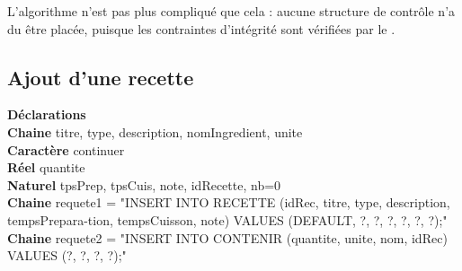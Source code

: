 \documentclass[a4paper,10pt]{report}
\begin{document}
L'algorithme n'est pas plus compliqué que cela : aucune structure de contrôle n'a du être placée, puisque les contraintes d'intégrité sont vérifiées par le .
%

\subsection{Ajout d'une recette}

\textbf{Déclarations}\\
	\indent\indent\textbf{Chaine} titre, type, description, nomIngredient, unite\\
	\indent\indent\textbf{Caractère} continuer\\
	\indent\indent\textbf{Réel} quantite\\
	\indent\indent\textbf{Naturel} tpsPrep, tpsCuis, note, idRecette, nb=0 \\
	\indent\indent\textbf{Chaine} requete1 = "INSERT INTO RECETTE (idRec, titre, type, description, tempsPrepara-\indent\indent tion, tempsCuisson, note) VALUES (DEFAULT, ?, ?, ?, ?, ?, ?);"\\
	\indent\indent\textbf{Chaine} requete2 = "INSERT INTO CONTENIR (quantite, unite, nom, idRec) VALUES (?, ?, ?, ?);"\\
\end{document}
